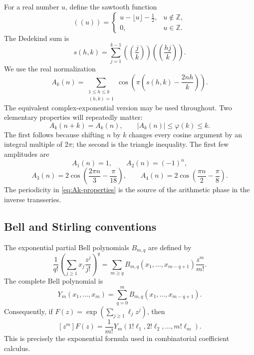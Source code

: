 \documentclass[11pt,a4paper]{article}
\numberwithin{equation}{section}
\theoremstyle{remark}
\newcommand{\ZZ}{\mathbb Z}
\begin{document}
For a real number $u$, define the sawtooth function
\begin{equation}
 ((u))=
 \begin{cases}
 u-\lfloor u\rfloor-\frac12,&u\notin\ZZ,\\
 0,&u\in\ZZ.
 \end{cases}
\end{equation}
The Dedekind sum is
\begin{equation}\label{eq:dedekind-sum}
 s(h,k)=\sum_{j=1}^{k-1}\left(\!\left(\frac jk\right)\!\right)
 \left(\!\left(\frac{hj}{k}\right)\!\right).
\end{equation}
We use the real normalization
\begin{equation}\label{eq:Ak-def}
 A_k(n)=\sum_{\substack{1\le h\le k\\(h,k)=1}}
 \cos\!\left(\pi\left(s(h,k)-\frac{2nh}{k}\right)\right).
\end{equation}
The equivalent complex-exponential version may be used throughout.  Two elementary properties will repeatedly matter:
\begin{equation}\label{eq:Ak-properties}
 A_k(n+k)=A_k(n),\qquad |A_k(n)|\le\varphi(k)\le k.
\end{equation}
The first follows because shifting $n$ by $k$ changes every cosine argument by an integral multiple of $2\pi$; the second is the triangle inequality.  The first few amplitudes are
\begin{equation}\label{eq:Ak-first}
 A_1(n)=1,\qquad A_2(n)=(-1)^n,
\end{equation}
\begin{equation}
 A_3(n)=2\cos\!\left(\frac{2\pi n}{3}-\frac{\pi}{18}\right),\qquad
 A_4(n)=2\cos\!\left(\frac{\pi n}{2}-\frac{\pi}{8}\right).
\end{equation}
The periodicity in \cref{eq:Ak-properties} is the source of the arithmetic phase in the inverse transseries.

\subsection{Bell and Stirling conventions}

The exponential partial Bell polynomials $B_{m,q}$ are defined by
\begin{equation}\label{eq:partial-bell-def}
 \frac1{q!}\left(\sum_{j\ge1}x_j\frac{z^j}{j!}\right)^q
 =\sum_{m\ge q}B_{m,q}(x_1,\ldots,x_{m-q+1})\frac{z^m}{m!}.
\end{equation}
The complete Bell polynomial is
\begin{equation}\label{eq:complete-bell-def}
 Y_m(x_1,\ldots,x_m)=\sum_{q=0}^{m}B_{m,q}(x_1,\ldots,x_{m-q+1}).
\end{equation}
Consequently, if $F(z)=\exp(\sum_{j\ge1}\ell_jz^j)$, then
\begin{equation}\label{eq:bell-exponential}
 [z^m]F(z)=\frac1{m!}Y_m(1!\ell_1,2!\ell_2,\ldots,m!\ell_m).
\end{equation}
This is precisely the exponential formula used in combinatorial coefficient calculus.
\end{document}
